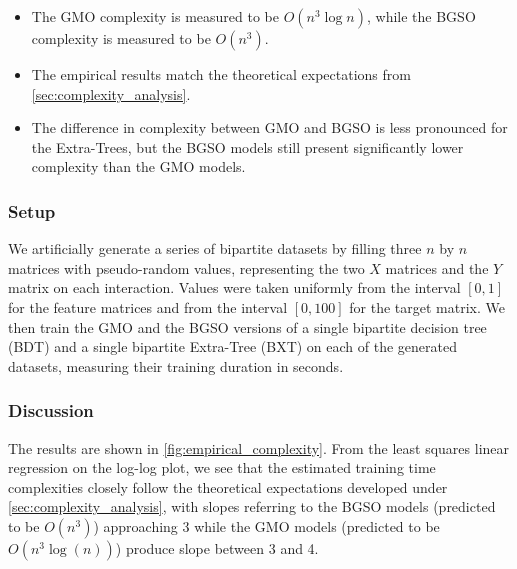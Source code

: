 \begin{mdframed}[frametitle={Key findings}]
    \begin{itemize}
        \item The GMO complexity is measured to be $O(n^3\log n)$, while the BGSO complexity is measured to be $O(n^3)$.

        \item The empirical results match the theoretical expectations from \autoref{sec:complexity_analysis}.
        
        \item The difference in complexity between GMO and BGSO is less pronounced for the Extra-Trees, but the BGSO models still present significantly lower complexity than the GMO models.
    \end{itemize}
\end{mdframed}

\subsubsection{Setup}

We artificially generate a series of bipartite datasets by filling three $n$ by $n$ matrices with pseudo-random values, representing the two $X$ matrices and the $Y$ matrix on each interaction. Values were taken uniformly from the interval $[0, 1]$ for the feature matrices and from the interval $[0, 100]$ for the target matrix.
%
We then train the GMO and the BGSO versions of a single bipartite decision tree (BDT) and a single bipartite Extra-Tree (BXT) on each of the generated datasets, measuring their training duration in seconds.

\subsubsection{Discussion}

The results are shown in \autoref{fig:empirical_complexity}. From the least squares linear regression on the log-log plot, we see that the estimated training time complexities closely follow the theoretical expectations developed under \autoref{sec:complexity_analysis}, with slopes referring to the BGSO models (predicted to be $O(n^3)$) approaching 3 while the GMO models (predicted to be $O(n^3\log(n))$) produce slope between 3 and 4.

